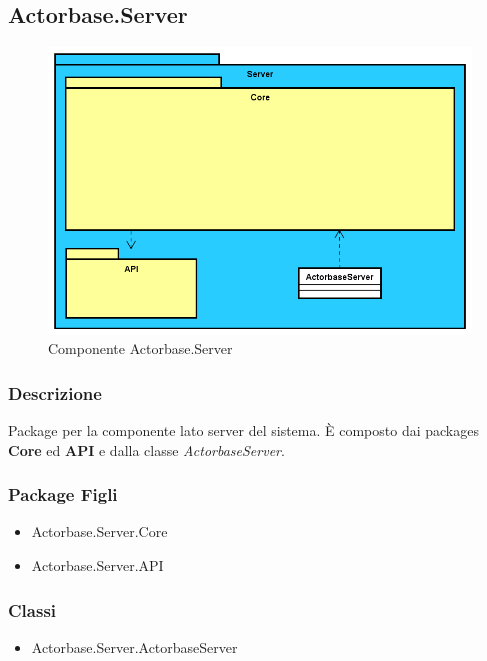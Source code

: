 \documentclass[a4paper]{article}
\begin{document}
		\subsection{Actorbase.Server}
			\begin{figure}[H]
			\centering
			\includegraphics[scale=0.50]{Server/Package/ServerLevel.png}
			\caption{Componente Actorbase.Server}
			\end{figure}
			\subsubsection{Descrizione}
				Package per la componente lato server del sistema. È composto dai packages \textbf{Core} ed \textbf{API} e dalla classe \emph{ActorbaseServer}.
			\subsubsection{Package Figli}
				\begin{itemize}
					\item Actorbase.Server.Core
					\item Actorbase.Server.API
				\end{itemize}
			\subsubsection{Classi}
			\begin{itemize}
				\item Actorbase.Server.ActorbaseServer
			\end{itemize}
\end{document}
